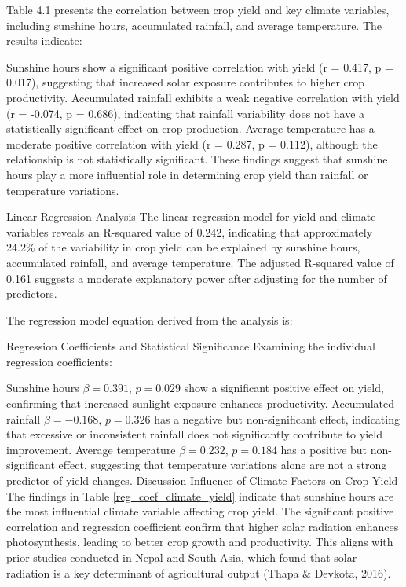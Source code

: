 Table 4.1 presents the correlation between crop yield and key climate variables, including sunshine hours, accumulated rainfall, and average temperature. The results indicate:

Sunshine hours show a significant positive correlation with yield (r = 0.417, p = 0.017), suggesting that increased solar exposure contributes to higher crop productivity.
Accumulated rainfall exhibits a weak negative correlation with yield (r = -0.074, p = 0.686), indicating that rainfall variability does not have a statistically significant effect on crop production.
Average temperature has a moderate positive correlation with yield (r = 0.287, p = 0.112), although the relationship is not statistically significant.
These findings suggest that sunshine hours play a more influential role in determining crop yield than rainfall or temperature variations.

Linear Regression Analysis
The linear regression model for yield and climate variables reveals an R-squared value of 0.242, indicating that approximately 24.2\% of the variability in crop yield can be explained by sunshine hours, accumulated rainfall, and average temperature. The adjusted R-squared value of 0.161 suggests a moderate explanatory power after adjusting for the number of predictors.

The regression model equation derived from the analysis is:


Regression Coefficients and Statistical Significance
Examining the individual regression coefficients:

Sunshine hours \(\beta = 0.391, \, p = 0.029\) show a significant positive effect on yield, confirming that increased sunlight exposure enhances productivity.
Accumulated rainfall \(\beta = -0.168, \, p = 0.326\) has a negative but non-significant effect, indicating that excessive or inconsistent rainfall does not significantly contribute to yield improvement.
Average temperature \(\beta = 0.232, \, p = 0.184\) has a positive but non-significant effect, suggesting that temperature variations alone are not a strong predictor of yield changes.
Discussion
Influence of Climate Factors on Crop Yield
The findings in Table \ref{reg_coef_climate_yield} indicate that sunshine hours are the most influential climate variable affecting crop yield. The significant positive correlation and regression coefficient confirm that higher solar radiation enhances photosynthesis, leading to better crop growth and productivity. This aligns with prior studies conducted in Nepal and South Asia, which found that solar radiation is a key determinant of agricultural output (Thapa \& Devkota, 2016).

